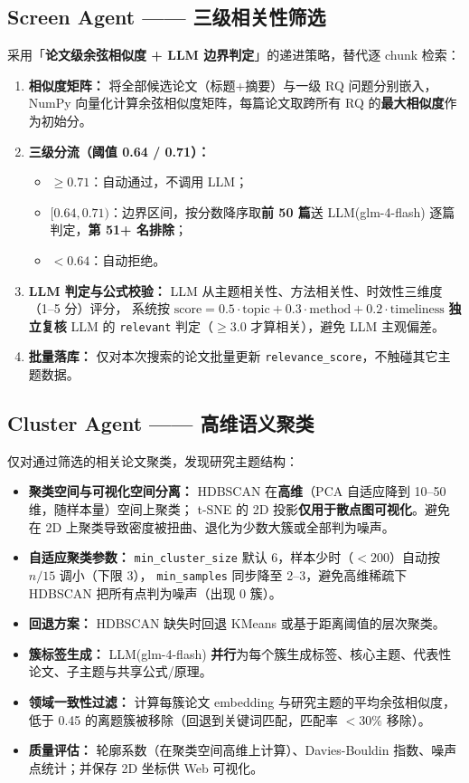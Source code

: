 \documentclass[10pt,a4paper]{article}
\begin{document}
\subsection{Screen Agent —— 三级相关性筛选}
采用「\textbf{论文级余弦相似度 + LLM 边界判定}」的递进策略，替代逐 chunk 检索：
\begin{enumerate}[leftmargin=2.2em,itemsep=0.05em]
  \item \textbf{相似度矩阵：} 将全部候选论文（标题+摘要）与一级 RQ 问题分别嵌入，
        NumPy 向量化计算余弦相似度矩阵，每篇论文取跨所有 RQ 的\textbf{最大相似度}作为初始分。
  \item \textbf{三级分流（阈值 0.64 / 0.71）：}
        \begin{itemize}[leftmargin=1.5em,itemsep=0.02em]
          \item $\geq 0.71$：自动通过，不调用 LLM；
          \item $[0.64, 0.71)$：边界区间，按分数降序取\textbf{前 50 篇}送 LLM(glm-4-flash) 逐篇判定，\textbf{第 51+ 名排除}；
          \item $< 0.64$：自动拒绝。
        \end{itemize}
  \item \textbf{LLM 判定与公式校验：} LLM 从主题相关性、方法相关性、时效性三维度（1–5 分）评分，
        系统按 $\text{score}=0.5\cdot\text{topic}+0.3\cdot\text{method}+0.2\cdot\text{timeliness}$ \textbf{独立复核}
        LLM 的 \texttt{relevant} 判定（$\geq 3.0$ 才算相关），避免 LLM 主观偏差。
  \item \textbf{批量落库：} 仅对本次搜索的论文批量更新 \texttt{relevance\_score}，不触碰其它主题数据。
\end{enumerate}

\subsection{Cluster Agent —— 高维语义聚类}
仅对通过筛选的相关论文聚类，发现研究主题结构：
\begin{itemize}[leftmargin=2.2em,itemsep=0.08em]
  \item \textbf{聚类空间与可视化空间分离：} HDBSCAN 在\textbf{高维}（PCA 自适应降到 10–50 维，随样本量）空间上聚类；
        t-SNE 的 2D 投影\textbf{仅用于散点图可视化}。避免在 2D 上聚类导致密度被扭曲、退化为少数大簇或全部判为噪声。
  \item \textbf{自适应聚类参数：} \texttt{min\_cluster\_size} 默认 6，样本少时（$<200$）自动按 $n/15$ 调小（下限 3），
        \texttt{min\_samples} 同步降至 2–3，避免高维稀疏下 HDBSCAN 把所有点判为噪声（出现 0 簇）。
  \item \textbf{回退方案：} HDBSCAN 缺失时回退 KMeans 或基于距离阈值的层次聚类。
  \item \textbf{簇标签生成：} LLM(glm-4-flash) \textbf{并行}为每个簇生成标签、核心主题、代表性论文、子主题与共享公式/原理。
  \item \textbf{领域一致性过滤：} 计算每簇论文 embedding 与研究主题的平均余弦相似度，
        低于 0.45 的离题簇被移除（回退到关键词匹配，匹配率 $<30\%$ 移除）。
  \item \textbf{质量评估：} 轮廓系数（在聚类空间高维上计算）、Davies-Bouldin 指数、噪声点统计；并保存 2D 坐标供 Web 可视化。
\end{itemize}
\end{document}
